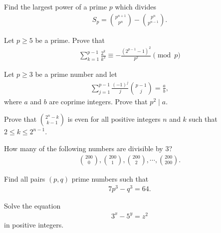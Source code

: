 \documentclass{subfile}
\begin{document}
	\begin{problem} %
		Find the largest power of a prime $p$ which divides
		\begin{align*}
		S_p=\binom{p^{n+1}}{p^n}-\binom{p^{n}}{p^{n-1}}.
		\end{align*}
	\end{problem}
	
	\begin{problem} %
		Let $p \geq 5$ be a prime. Prove that
		\begin{align*}
		\sum_{k=1}^{p-1}\frac{2^k}{k^2}\equiv-\frac{(2^{p-1}-1)^2}{p^2}\pmod p
		\end{align*}
	\end{problem}
	
	\begin{problem} %
		Let $p\geq 3$ be a prime number and let
		\begin{align*}
		\sum_{j=1}^{p-1}\frac{(-1)^{j}}{j} \binom{p-1}{j} =\frac{a}{b},
		\end{align*}
		where $a$ and $b$ are coprime integers. Prove that $p^2\mid a$.
	\end{problem}
	
	\begin{problem} %
		Prove that $2^n-k\choose k-1 $ is even for all positive integers $n$ and $k$ such that $2\le k\le 2^{n-1}$.
	\end{problem}
	
	\begin{problem} %
		How many of the following numbers are divisible by $3$?
		\begin{align*}
		\binom{200}{0}, \binom{200}{1}, \binom{200}{2}, \cdots, \binom{200}{200}.
		\end{align*}
	\end{problem}

	
	\begin{problem} %
		Find all pairs $(p,q)$ prime numbers such that
			\begin{align*}
				7 p^3 - q^3 = 64.
			\end{align*}
	\end{problem}
	
	\begin{problem}[BMO 2009] %
		Solve the equation
			\begin{align*}
				3^x - 5^y = z^2
			\end{align*}
		in positive integers.
	\end{problem}
	
\end{document}
